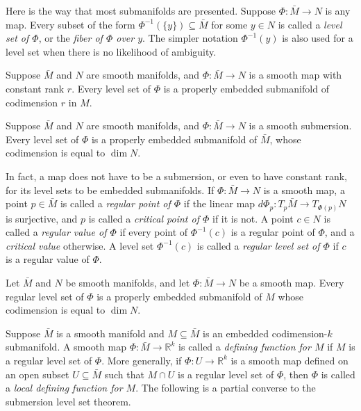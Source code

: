 Here is the way that most submanifolds are presented. Suppose $\Phi: \bar{M} \to N$ is any map. Every subset of the form $\Phi^{-1}(\{y\}) \subseteq \bar{M}$ for some $y \in N$ is called a \emph{level set of $\Phi$}, or the \emph{fiber of $\Phi$ over $y$}. The simpler notation $\Phi^{-1}(y)$ is also used for a level set when there is no likelihood of ambiguity.

\begin{theorem}
\label{thm:constant-rank-level-set}
Suppose $\bar{M}$ and $N$ are smooth manifolds, and $\Phi: \bar{M} \to N$ is a smooth map with constant rank $r$. Every level set of $\Phi$ is a properly embedded submanifold of codimension $r$ in $M$.
\end{theorem}

\begin{corollary}
\label{cor:submersion-level-set}
Suppose $\bar{M}$ and $N$ are smooth manifolds, and $\Phi: \bar{M} \to N$ is a smooth submersion. Every level set of $\Phi$ is a properly embedded submanifold of $\bar{M}$, whose codimension is equal to $\dim N$.
\end{corollary}

In fact, a map does not have to be a submersion, or even to have constant rank, for its level sets to be embedded submanifolds. If $\Phi: \bar{M} \to N$ is a smooth map, a point $p \in \bar{M}$ is called a \emph{regular point of $\Phi$} if the linear map $d\Phi_p: T_p \bar{M} \to T_{\Phi(p)} N$ is surjective, and $p$ is called a \emph{critical point of $\Phi$} if it is not. A point $c \in N$ is called a \emph{regular value of $\Phi$} if every point of $\Phi^{-1}(c)$ is a regular point of $\Phi$, and a \emph{critical value} otherwise. A level set $\Phi^{-1}(c)$ is called a \emph{regular level set of $\Phi$} if $c$ is a regular value of $\Phi$.

\begin{corollary}
\label{cor:regular-level-set}
Let $\bar{M}$ and $N$ be smooth manifolds, and let $\Phi: \bar{M} \to N$ be a smooth map. Every regular level set of $\Phi$ is a properly embedded submanifold of $M$ whose codimension is equal to $\dim N$.
\end{corollary}

Suppose $\bar{M}$ is a smooth manifold and $M \subseteq \bar{M}$ is an embedded codimension-$k$ submanifold. A smooth map $\Phi: \bar{M} \to \mathbb{R}^k$ is called a \emph{defining function for $M$} if $M$ is a regular level set of $\Phi$. More generally, if $\Phi: U \to \mathbb{R}^k$ is a smooth map defined on an open subset $U \subseteq \bar{M}$ such that $M \cap U$ is a regular level set of $\Phi$, then $\Phi$ is called a \emph{local defining function for $M$}. The following is a partial converse to the submersion level set theorem.

